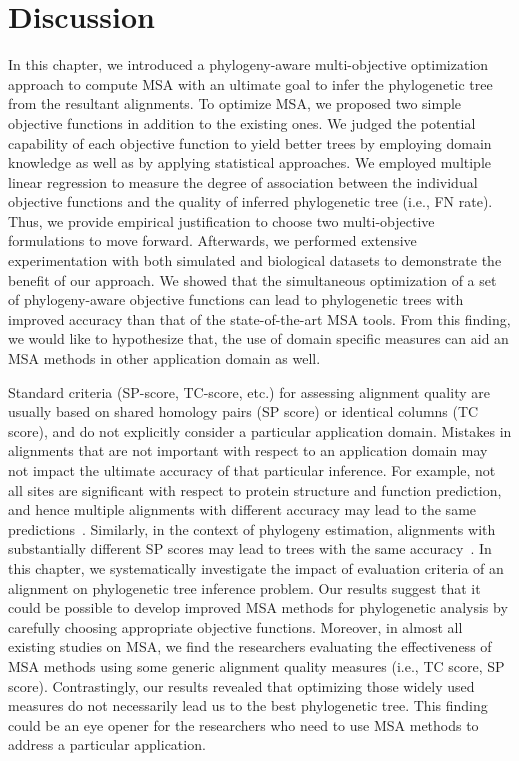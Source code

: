 \section{Discussion}
\label{sec:cyb-final-discussion}
In this chapter, we introduced a phylogeny-aware multi-objective optimization approach to compute MSA with an ultimate goal to infer the phylogenetic tree from the resultant alignments. To optimize MSA, we proposed two simple objective functions in addition to the existing ones. We judged the potential capability of each objective function to yield better trees by employing domain knowledge as well as by applying statistical approaches. We employed multiple linear regression to measure the degree of association between the individual objective functions and the quality of inferred phylogenetic tree (i.e., FN rate). Thus, we provide empirical justification to choose two multi-objective formulations to move forward. Afterwards, we performed extensive experimentation with both simulated and biological datasets to demonstrate the benefit of our approach. We showed that the simultaneous optimization of a set of phylogeny-aware objective functions can lead to phylogenetic trees with improved accuracy than that of the state-of-the-art MSA tools. From this finding, we would like to hypothesize that, the use of domain specific measures can aid an MSA methods in other application domain as well.

Standard criteria (SP-score, TC-score, etc.) for assessing alignment quality are usually based on shared homology pairs (SP score) or identical columns (TC score), and do not explicitly consider a particular application domain. Mistakes in alignments that are not important with respect to an application domain may not impact the ultimate accuracy of that particular inference. For example, not all sites are significant with respect to protein structure and function prediction, and hence multiple alignments with different accuracy may lead to the same predictions~\citep{warnow2013large}. Similarly, in the context of phylogeny estimation, alignments with substantially different SP scores may lead to trees with the same accuracy~\citep{liu2009rapid}. In this chapter, we systematically investigate the impact of evaluation criteria of an alignment on phylogenetic tree inference problem. Our results suggest that it could be possible to develop improved MSA methods for phylogenetic analysis by carefully choosing appropriate objective functions. Moreover, in almost all existing studies on MSA, we find the researchers evaluating the effectiveness of MSA methods using some generic alignment quality measures (i.e., TC score, SP score). Contrastingly, our results revealed that optimizing those widely used measures do not necessarily lead us to the best phylogenetic tree. This finding could be an eye opener for the researchers who need to use MSA methods to address a particular application. 

